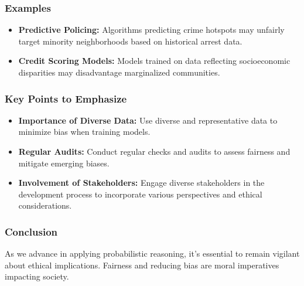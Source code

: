 \documentclass[aspectratio=169]{beamer}
\begin{document}
\begin{frame}[fragile]
    \frametitle{Examples}
    
    \begin{itemize}
        \item \textbf{Predictive Policing:} Algorithms predicting crime hotspots may unfairly target minority neighborhoods based on historical arrest data.
        \item \textbf{Credit Scoring Models:} Models trained on data reflecting socioeconomic disparities may disadvantage marginalized communities.
    \end{itemize}
\end{frame}

\begin{frame}[fragile]
    \frametitle{Key Points to Emphasize}
    
    \begin{itemize}
        \item \textbf{Importance of Diverse Data:} Use diverse and representative data to minimize bias when training models.
        \item \textbf{Regular Audits:} Conduct regular checks and audits to assess fairness and mitigate emerging biases.
        \item \textbf{Involvement of Stakeholders:} Engage diverse stakeholders in the development process to incorporate various perspectives and ethical considerations.
    \end{itemize}
\end{frame}

\begin{frame}[fragile]
    \frametitle{Conclusion}
    
    As we advance in applying probabilistic reasoning, it's essential to remain vigilant about ethical implications. Fairness and reducing bias are moral imperatives impacting society.
\end{frame}
\end{document}
